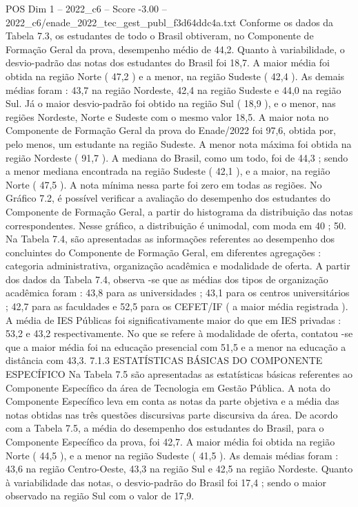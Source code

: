 \begin{textsample}{POS Dim 1 – 2022\_c6 – Score -3.00 – 2022\_c6/enade\_2022\_tec\_gest\_publ\_f3d64ddc4a.txt}
Conforme os dados da Tabela 7.3, os estudantes de todo o Brasil obtiveram, no Componente de Formação Geral da prova, desempenho médio de 44,2.
Quanto à variabilidade, o desvio-padrão das notas dos estudantes do Brasil foi 18,7.
A maior média foi obtida na região Norte ( 47,2 ) e a menor, na região Sudeste ( 42,4 ).
As demais médias foram : 43,7 na região Nordeste, 42,4 na região Sudeste e 44,0 na região Sul.
Já o maior desvio-padrão foi obtido na região Sul ( 18,9 ), e o menor, nas regiões Nordeste, Norte e Sudeste com o mesmo valor 18,5.
A maior nota no Componente de Formação Geral da prova do Enade/2022 foi 97,6, obtida por, pelo menos, um estudante na região Sudeste.
A menor nota máxima foi obtida na região Nordeste ( 91,7 ).
A mediana do Brasil, como um todo, foi de 44,3 ; sendo a menor mediana encontrada na região Sudeste ( 42,1 ), e a maior, na região Norte ( 47,5 ).
A nota mínima nessa parte foi zero em todas as regiões.
No Gráfico 7.2, é possível verificar a avaliação do desempenho dos estudantes do Componente de Formação Geral, a partir do histograma da distribuição das notas correspondentes.
Nesse gráfico, a distribuição é unimodal, com moda em 40 ; 50.
Na Tabela 7.4, são apresentadas as informações referentes ao desempenho dos concluintes do Componente de Formação Geral, em diferentes agregações : categoria administrativa, organização acadêmica e modalidade de oferta.
A partir dos dados da Tabela 7.4, observa -se que as médias dos tipos de organização acadêmica foram : 43,8 para as universidades ; 43,1 para os centros universitários ; 42,7 para as faculdades e 52,5 para os CEFET/IF ( a maior média registrada ).
A média de IES Públicas foi significativamente maior do que em IES privadas : 53,2 e 43,2 respectivamente.
No que se refere à modalidade de oferta, contatou -se que a maior média foi na educação presencial com 51,5 e a menor na educação a distância com 43,3. 7.1.3 ESTATÍSTICAS BÁSICAS DO COMPONENTE ESPECÍFICO Na Tabela 7.5 são apresentadas as estatísticas básicas referentes ao Componente Específico da área de Tecnologia em Gestão Pública.
A nota do Componente Específico leva em conta as notas da parte objetiva e a média das notas obtidas nas três questões discursivas parte discursiva da área.
De acordo com a Tabela 7.5, a média do desempenho dos estudantes do Brasil, para o Componente Específico da prova, foi 42,7.
A maior média foi obtida na região Norte ( 44,5 ), e a menor na região Sudeste ( 41,5 ).
As demais médias foram : 43,6 na região Centro-Oeste, 43,3 na região Sul e 42,5 na região Nordeste.
Quanto à variabilidade das notas, o desvio-padrão do Brasil foi 17,4 ; sendo o maior observado na região Sul com o valor de 17,9.

\end{textsample}
